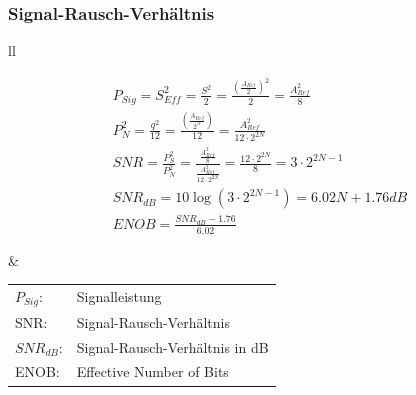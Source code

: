 \subsubsection{Signal-Rausch-Verhältnis}
\begin{tabular}{ll}

\begin{minipage}{10cm}
\begin{gather}
P_{Sig}=S^2_{Eff} =
\frac{S^2}{2}=\frac{(\frac{A_{Ref}}{2})^2}{2}=\frac{A^2_{Ref}}{8}\\
P^2_{N}=\frac{q^2}{12}=\frac{(\frac{A_{Ref}}{2^N})}{12}=\frac{A^2_{Ref}}{12\cdot2^{2N}}\\
SNR=\frac{P^2_{S}}{P^2_{N}}=\frac{\frac{A^2_{Ref}}{8}}{\frac{A^2_{Ref}}{12\cdot2^{2N}}}=\frac{12\cdot2^{2N}}{8}=3\cdot2^{2N-1}\\
SNR_{dB}=10\log(3\cdot2^{2N-1})=6.02N+1.76dB\\
ENOB=\frac{SNR_{dB}-1.76}{6.02}
\end{gather}
\end{minipage}
&
\begin{minipage}{8cm}
\begin{tabular}{ll}
$P_{Sig}$:&Signalleistung\\
SNR:&Signal-Rausch-Verhältnis\\
$SNR_{dB}$:&Signal-Rausch-Verhältnis in dB\\
ENOB:&Effective Number of Bits\\
\end{tabular}
\end{minipage}
\end{tabular}
